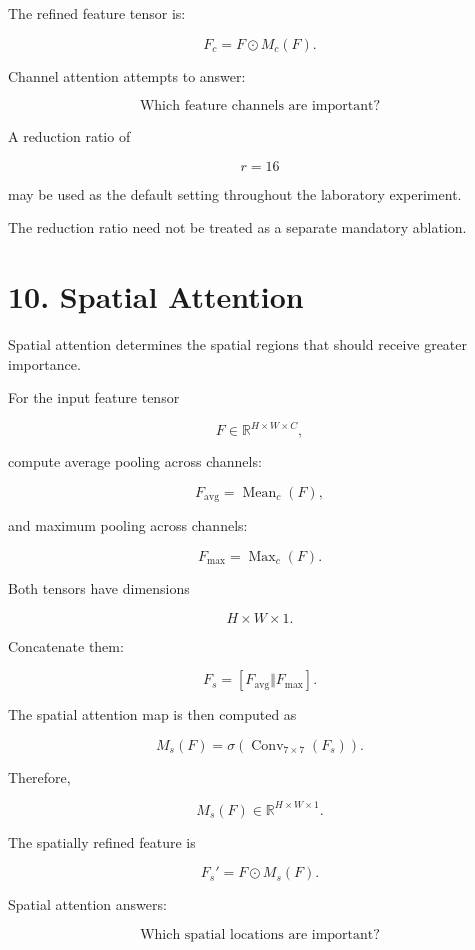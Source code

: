 \documentclass[10pt]{article}
\begin{document}
The refined feature tensor is:

\[
F_c
=
F\odot M_c(F).
\]

Channel attention attempts to answer:

\[
\boxed{\text{Which feature channels are important?}}
\]

A reduction ratio of

\[
r=16
\]

may be used as the default setting throughout the laboratory experiment.

The reduction ratio need not be treated as a separate mandatory ablation.

\section*{10. Spatial Attention}

Spatial attention determines the spatial regions that should receive greater
importance.

For the input feature tensor

\[
F\in\mathbb{R}^{H\times W\times C},
\]

compute average pooling across channels:

\[
F_{\mathrm{avg}}
=
\operatorname{Mean}_{c}(F),
\]

and maximum pooling across channels:

\[
F_{\mathrm{max}}
=
\operatorname{Max}_{c}(F).
\]

Both tensors have dimensions

\[
H\times W\times1.
\]

Concatenate them:

\[
F_s
=
[
F_{\mathrm{avg}}
\Vert
F_{\mathrm{max}}
].
\]

The spatial attention map is then computed as

\[
M_s(F)
=
\sigma
\left(
\operatorname{Conv}_{7\times7}(F_s)
\right).
\]

Therefore,

\[
M_s(F)
\in
\mathbb{R}^{H\times W\times1}.
\]

The spatially refined feature is

\[
F_s'
=
F\odot M_s(F).
\]

Spatial attention answers:

\[
\boxed{\text{Which spatial locations are important?}}
\]

\end{document}
